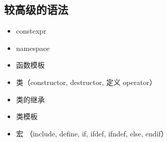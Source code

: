 \subsection{较高级的语法}
\begin{itemize}
\item constexpr
\item namespace
\item 函数模板
\item 类（constructor, destructor, 定义 operator）
\item 类的继承
\item 类模板
\item 宏 （include, define, if, ifdef, ifndef, else, endif）
\end{itemize}
